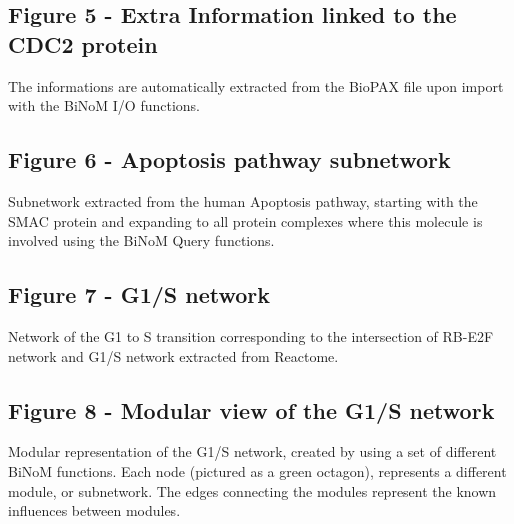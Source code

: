 \documentclass[10pt]{bmc_article}
\newenvironment{bmcformat}{\baselineskip20pt\sloppy\setboolean{publ}{false}}{\baselineskip20pt\sloppy}
\begin{document}
\begin{bmcformat}
   \subsection*{Figure 5 - Extra Information linked to the CDC2 protein}
      The informations are automatically extracted from the BioPAX file upon
import with the BiNoM I/O functions.

  \subsection*{Figure 6 - Apoptosis pathway subnetwork}
      Subnetwork extracted from the human Apoptosis pathway, starting with the
SMAC protein and expanding to all protein complexes where this
molecule is involved using the BiNoM Query functions.


  \subsection*{Figure 7 - G1/S network}
	Network of the G1 to S transition corresponding to the intersection of
RB-E2F network and G1/S network extracted from Reactome.
      

  \subsection*{Figure 8 - Modular view of the G1/S network}
	Modular representation of the G1/S network, created by using a set of
different BiNoM functions. Each node (pictured as a green octagon), represents a
different module, or subnetwork. The edges connecting the modules represent the
 known influences between modules. 







\end{bmcformat}
\end{document}
